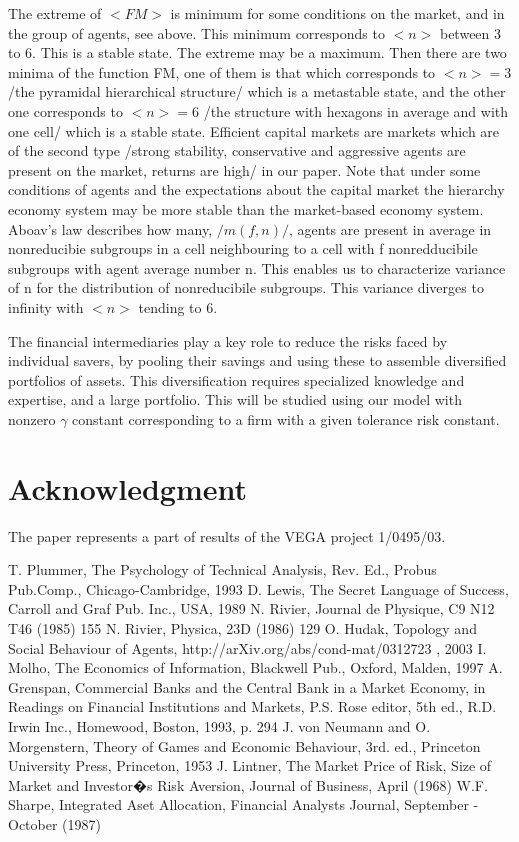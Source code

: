 \documentclass[10pt]{article}
\begin{document}
The extreme of $<FM>$ is minimum for some conditions on the market, and in the group of agents, see above. This minimum corresponds to $<n>$ between 3 to 6. This is a stable state. The extreme may be a maximum. Then there are two minima of the function FM, one of them is that which corresponds to $<n> = 3$ /the pyramidal hierarchical structure/ which is a metastable state, and the other one corresponds to $<n> = 6$ /the structure with hexagons in average and with one cell/ which is a stable state. Efficient capital markets are markets which are of the second type /strong stability, conservative and aggressive agents are present on the market, returns are high/ in our paper. Note that under some conditions of agents and the expectations 
about the capital market the hierarchy economy system may be more stable than the market-based economy system.
 Aboav's law describes how many, $/m(f,n)/$, agents are present in average in nonreducibie subgroups in a cell neighbouring to a cell with f nonredducibile subgroups with agent average number n. This enables us to characterize variance of n for the distribution of nonreducibile subgroups. This variance diverges to infinity with $<n>$ tending to 6.

The financial intermediaries play a key role to reduce the risks faced by individual savers, by pooling their savings and using these to assemble diversified portfolios of assets. This diversification requires specialized knowledge and expertise, and a large portfolio. This will be studied using our model with nonzero $\gamma $ constant corresponding to a firm with a given tolerance risk constant.

\section*{Acknowledgment}

The paper represents a part of results of the VEGA project 1/0495/03.


\begin{thebibliography}{A}
T. Plummer, The Psychology of Technical Analysis, Rev. Ed., Probus Pub.Comp., Chicago-Cambridge, 1993
D. Lewis, The Secret Language of Success, Carroll and Graf Pub. Inc., USA, 1989
N. Rivier, Journal de Physique, C9 N12 T46 (1985) 155
N. Rivier, Physica, 23D (1986) 129
O. Hudak, Topology and Social Behaviour of Agents,  http://arXiv.org/abs/cond-mat/0312723 , 2003
I. Molho, The Economics of Information, Blackwell Pub., Oxford, Malden, 1997
A. Grenspan, Commercial Banks and the Central Bank in a Market Economy, in Readings on Financial Institutions and Markets, P.S. Rose editor, 5th ed., R.D. Irwin Inc., Homewood, Boston, 1993, p. 294
J. von Neumann and O. Morgenstern, Theory of Games and Economic Behaviour, 3rd. ed., Princeton University Press, Princeton, 1953
J. Lintner, The Market Price of Risk, Size of Market and Investor�s Risk Aversion, Journal of Business, April (1968)
W.F. Sharpe, Integrated Aset Allocation, Financial Analysts Journal, September -October (1987)
\end{thebibliography}
\end{document}
